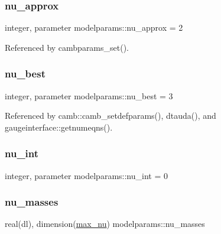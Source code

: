 \mbox{\label{namespacemodelparams_ac509ce908abffae5d206533cc7eddfe9}} 
\subsubsection{\texorpdfstring{nu\+\_\+approx}{nu\_approx}}
{\footnotesize\ttfamily integer, parameter modelparams\+::nu\+\_\+approx = 2}



Referenced by cambparams\+\_\+set().

\mbox{\label{namespacemodelparams_a1da306d0a7758bf910362b6d62e6658f}} 
\subsubsection{\texorpdfstring{nu\+\_\+best}{nu\_best}}
{\footnotesize\ttfamily integer, parameter modelparams\+::nu\+\_\+best = 3}



Referenced by camb\+::camb\+\_\+setdefparams(), dtauda(), and gaugeinterface\+::getnumeqns().

\mbox{\label{namespacemodelparams_a6886b2553f1b2657b012618d5377619d}} 
\subsubsection{\texorpdfstring{nu\+\_\+int}{nu\_int}}
{\footnotesize\ttfamily integer, parameter modelparams\+::nu\+\_\+int = 0}

\mbox{\label{namespacemodelparams_a4cbebdfc6776f516e062c03bc9c26d7f}} 
\subsubsection{\texorpdfstring{nu\+\_\+masses}{nu\_masses}}
{\footnotesize\ttfamily real(dl), dimension(\mbox{\hyperlink{namespacemodelparams_a5e3667fcd2aae0fb15654c207fc6830e}{max\+\_\+nu}}) modelparams\+::nu\+\_\+masses}



